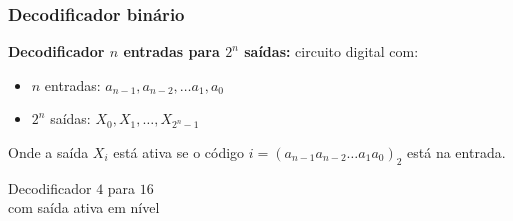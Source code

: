\documentclass{beamer}
\begin{document}
\begin{frame}
\frametitle{Decodificador binário}

\textbf{Decodificador $n$ entradas para $2^n$ saídas:} circuito digital
com:
\begin{itemize}
\item $n$ entradas: $a_{n-1}, a_{n-2}, \ldots a_1, a_0$
\item $2^n$ saídas: $X_0, X_1, \ldots, X_{2^n-1}$
\end{itemize}
Onde a saída $X_i$ está ativa se o código $i = (a_{n-1} a_{n-2} \ldots a_1 a_0)_2$ está na entrada.

\pause
\centering
\begin{minipage}{44mm}
\end{minipage}
\begin{minipage}{50mm}
Decodificador $4$ para $16$\\
com saída ativa em nível
\end{minipage}

\end{frame}
\end{document}

